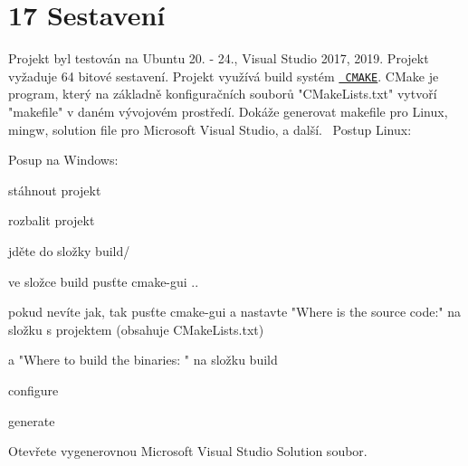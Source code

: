 \chapter{17 Sestavení}
\hypertarget{p17_sestaveni}{}\label{p17_sestaveni}
Projekt byl testován na Ubuntu 20. -\/ 24., Visual Studio 2017, 2019. Projekt vyžaduje 64 bitové sestavení. Projekt využívá build systém \href{https://cmake.org/}{\texttt{ CMAKE}}. CMake je program, který na základně konfiguračních souborů "{}\+CMake\+Lists.\+txt"{} vytvoří "{}makefile"{} v daném vývojovém prostředí. Dokáže generovat makefile pro Linux, mingw, solution file pro Microsoft Visual Studio, a další.~\newline
 Postup Linux\+: 
\begin{DoxyCode}{0}

\end{DoxyCode}
 Posup na Windows\+:
\begin{DoxyEnumerate}
\item stáhnout projekt
\item rozbalit projekt
\item jděte do složky build/
\item ve složce build pusťte cmake-\/gui ..
\item pokud nevíte jak, tak pusťte cmake-\/gui a nastavte "{}\+Where is the source code\+:"{} na složku s projektem (obsahuje CMake\+Lists.\+txt)
\item a "{}\+Where to build the binaries\+: "{} na složku build
\item configure
\item generate
\item Otevřete vygenerovnou Microsoft Visual Studio Solution soubor. 
\end{DoxyEnumerate}